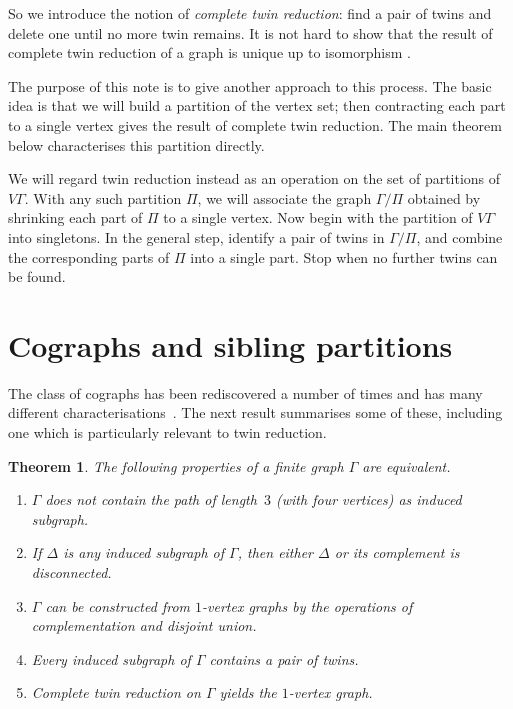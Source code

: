 \documentclass[12pt]{article}
\newtheorem{theorem}{Theorem}[section]
\begin{document}
So we introduce the notion of \emph{complete twin reduction}: find a pair
of twins and delete one until no more twin remains. It is not hard to show
that the result of complete twin reduction of a graph is unique up to
isomorphism \cite[Theorem 7.1]{gog}.

The purpose of this note is to give another approach to this process. The
basic idea is that we will build a partition of the vertex set; then
contracting each part to a single vertex gives the result of complete
twin reduction. The main theorem below characterises this partition directly.

We will regard twin reduction instead as an operation on the set of partitions
of $V\Gamma$. With any such partition $\Pi$, we will associate the graph 
$\Gamma/\Pi$ obtained by shrinking each part of $\Pi$ to a single vertex. Now
begin with the partition of $V\Gamma$ into singletons. In the general step,
identify a pair of twins in $\Gamma/\Pi$, and combine the corresponding parts
of $\Pi$ into a single part. Stop when no further twins can be found.

\section{Cographs and sibling partitions}

The class of cographs has been rediscovered a number of times and has many
different characterisations~\cite{jung,seinsche,sumner}. The next result
summarises some of these, including one which is particularly relevant to twin
reduction.

\begin{theorem}
The following properties of a finite graph $\Gamma$ are equivalent.
\begin{enumerate}
\item $\Gamma$ does not contain the path of length~$3$ (with four vertices)
as induced subgraph.
\item If $\Delta$ is any induced subgraph of $\Gamma$, then either $\Delta$ or
its complement is disconnected.
\item $\Gamma$ can be constructed from $1$-vertex graphs by the operations of
complementation and disjoint union.
\item Every induced subgraph of $\Gamma$ contains a pair of twins.
\item Complete twin reduction on $\Gamma$ yields the $1$-vertex graph.
\end{enumerate}
\end{theorem}
\end{document}
